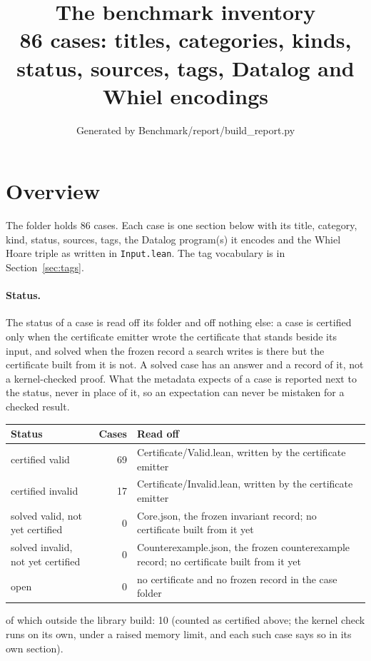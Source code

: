 \documentclass[10pt]{article}
\title{The benchmark inventory\\\large 86 cases: titles, categories, kinds, status, sources, tags, Datalog and Whiel encodings}
\author{Generated by Benchmark/report/build\_report.py}
\date{}
\begin{document}
\maketitle

\tableofcontents

\clearpage

\section{Overview}\label{sec:overview}

The folder  holds 86 cases. Each case is one section below with its title, category, kind, status, sources, tags, the Datalog program(s) it encodes and the Whiel Hoare triple as written in \texttt{Input.lean}. The tag vocabulary is in Section~\ref{sec:tags}.

\paragraph{Status.} The status of a case is read off its folder and off nothing else: a case is certified only when the certificate emitter wrote the certificate that stands beside its input, and solved when the frozen record a search writes is there but the certificate built from it is not. A solved case has an answer and a record of it, not a kernel-checked proof. What the metadata expects of a case is reported next to the status, never in place of it, so an expectation can never be mistaken for a checked result.
\begin{tabular}{@{}lrp{}@{}}
\toprule
Status & Cases & Read off \\
\midrule
certified valid & 69 & Certificate/Valid.lean, written by the certificate emitter \\
certified invalid & 17 & Certificate/Invalid.lean, written by the certificate emitter \\
solved valid, not yet certified & 0 & Core.json, the frozen invariant record; no certificate built from it yet \\
solved invalid, not yet certified & 0 & Counterexample.json, the frozen counterexample record; no certificate built from it yet \\
open & 0 & no certificate and no frozen record in the case folder \\
\bottomrule
\end{tabular}
\par of which outside the library build: 10 (counted as certified above; the kernel check runs on its own, under a raised memory limit, and each such case says so in its own section).
\end{document}
